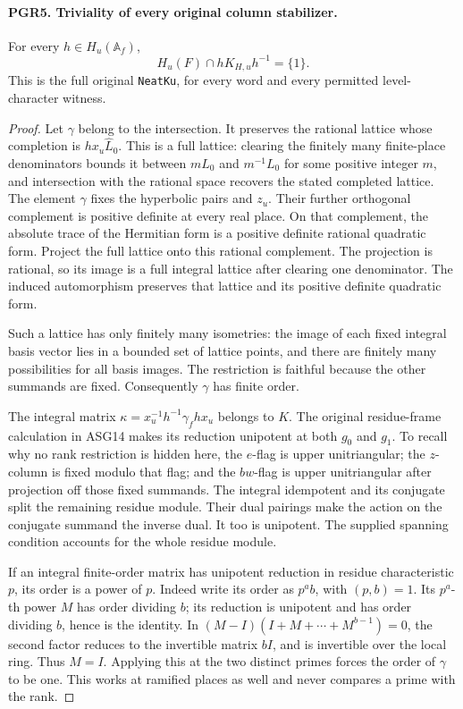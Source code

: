 \documentclass[11pt,a4paper]{article}
\numberwithin{equation}{section}
\theoremstyle{remark}\newtheorem{remark}[theorem]{Remark}
\begin{document}
\paragraph{PGR5. Triviality of every original column stabilizer.}
\label{claim:PGR5}
For every \(h\in H_u(\mathbb A_f)\),
\[
          H_u(F)\cap hK_{H,u}h^{-1}=\{1\}.
\tag{PGR.14}
\]
This is the full original \texttt{Neat\allowbreak Ku}, for every word and
every permitted level-character witness.
\begin{proof}
Let \(\gamma\) belong to the intersection.  It preserves the
rational lattice whose completion is \(hx_u\widehat L_0\).
This is a full lattice: clearing the finitely many finite-place
denominators bounds it between \(mL_0\) and \(m^{-1}L_0\)
for some positive integer \(m\), and intersection with the rational
space recovers the stated completed lattice.  The element \(\gamma\)
fixes the hyperbolic pairs and \(z_u\).  Their further orthogonal
complement is positive definite at every real place.  On that
complement, the absolute trace of the Hermitian form is a positive
definite rational quadratic form.  Project the full lattice onto
this rational complement.  The projection is rational, so its image
is a full integral lattice after clearing one denominator.
The induced automorphism preserves that lattice and its positive
definite quadratic form.

Such a lattice has only finitely many isometries: the image of each
fixed integral basis vector lies in a bounded set of lattice points,
and there are finitely many possibilities for all basis images.
The restriction is faithful because the other summands are fixed.
Consequently \(\gamma\) has finite order.

The integral matrix
\(\kappa=x_u^{-1}h^{-1}\gamma_fhx_u\) belongs to \(K\).
The original residue-frame calculation in ASG14 makes its reduction
unipotent at both \(g_0\) and \(g_1\).  To recall why no rank
restriction is hidden here, the \(e\)-flag is upper unitriangular;
the \(z\)-column is fixed modulo that flag; and the \(bw\)-flag
is upper unitriangular after projection off those fixed summands.
The integral idempotent and its conjugate split the remaining
residue module.  Their dual pairings make the action on the conjugate
summand the inverse dual.  It too is unipotent.  The supplied spanning
condition accounts for the whole residue module.

If an integral finite-order matrix has unipotent reduction in residue
characteristic \(p\), its order is a power of \(p\).  Indeed write
its order as \(p^ab\), with \((p,b)=1\).  Its \(p^a\)-th
power \(M\) has order dividing \(b\); its reduction is unipotent
and has order dividing \(b\), hence is the identity.  In
\((M-I)(I+M+\cdots+M^{b-1})=0\), the second factor reduces
to the invertible matrix \(bI\), and is invertible over the local
ring.  Thus \(M=I\).  Applying this at the two distinct primes
forces the order of \(\gamma\) to be one.  This works at ramified
places as well and never compares a prime with the rank.
\end{proof}
\end{document}
